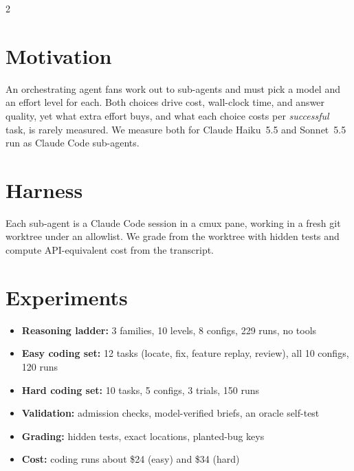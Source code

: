 \documentclass[a4paper,9pt]{extarticle}
\begin{document}
\begin{multicols}{2}
\raggedcolumns

\section*{Motivation}
An orchestrating agent fans work out to sub-agents and must pick a model and
an effort level for each. Both choices drive cost, wall-clock time, and answer
quality, yet what extra effort buys, and what each choice costs per
\emph{successful} task, is rarely measured. We measure both for Claude Haiku~5.5
and Sonnet~5.5 run as Claude Code sub-agents.

\section*{Harness}
\begin{center}
\resizebox{0.7\linewidth}{!}{}
\end{center}
\vspace{-0.4em}
\noindent Each sub-agent is a Claude Code session in a cmux pane, working in
a fresh git worktree under an allowlist. We grade from the worktree with hidden
tests and compute API-equivalent cost from the transcript.

\section*{Experiments}
\begin{itemize}
  \item \textbf{Reasoning ladder:} 3 families, 10 levels, 8 configs, 229 runs, no tools
  \item \textbf{Easy coding set:} 12 tasks (locate, fix, feature replay, review), all 10 configs, 120 runs
  \item \textbf{Hard coding set:} 10 tasks, 5 configs, 3 trials, 150 runs
  \item \textbf{Validation:} admission checks, model-verified briefs, an oracle self-test
  \item \textbf{Grading:} hidden tests, exact locations, planted-bug keys
  \item \textbf{Cost:} coding runs about \$24 (easy) and \$34 (hard)
\end{itemize}


\end{multicols}
\end{document}
